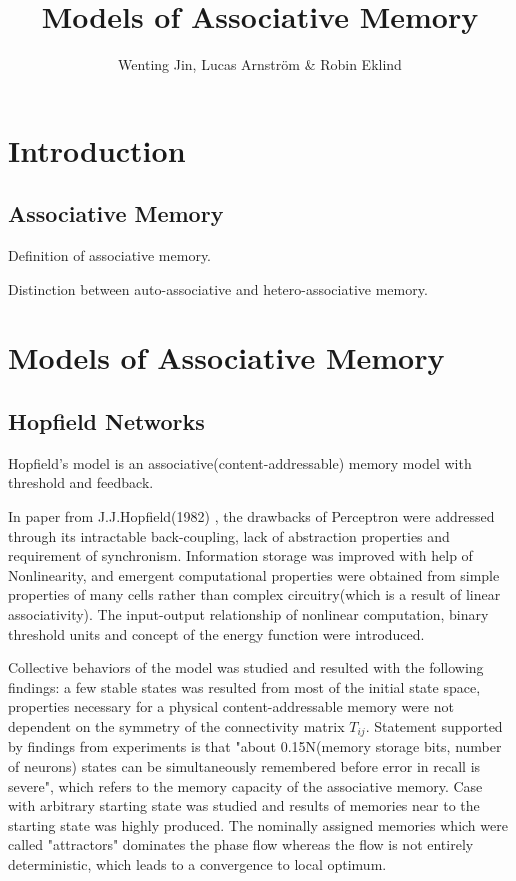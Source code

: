 \documentclass[12pt, a4paper]{article}
\title{Models of Associative Memory}
\author{Wenting Jin, Lucas Arnström \& Robin Eklind}
\begin{document}
\maketitle

\tableofcontents

\clearpage



\section{Introduction}

\subsection{Associative Memory}

Definition of associative memory.

Distinction between auto-associative and hetero-associative memory.


\section{Models of Associative Memory}

\subsection{Hopfield Networks}

Hopfield's model is an associative(content-addressable) memory model with threshold and feedback.

In paper from J.J.Hopfield(1982) \cite{computational_abilities}, the drawbacks of Perceptron were addressed through its intractable back-coupling, lack of abstraction properties and requirement of synchronism. Information storage was improved with help of Nonlinearity, and emergent computational properties were obtained from simple properties of many cells rather than complex circuitry(which is a result of linear associativity). The input-output relationship of nonlinear computation, binary threshold units and concept of the energy function were introduced.

Collective behaviors of the model was studied and resulted with the following findings: a few stable states was resulted from most of the initial state space, properties necessary for a physical content-addressable memory were not dependent on the symmetry of the connectivity matrix $T_{ij}$. Statement supported by findings from experiments is that "about 0.15N(memory storage bits, number of neurons) states can be simultaneously remembered before error in recall is severe", which refers to the memory capacity of the associative memory. Case with arbitrary starting state was studied and results of memories near to the starting state was highly produced. The nominally assigned memories which were called "attractors" dominates the phase flow whereas the flow is not entirely deterministic, which leads to a convergence to local optimum.
\end{document}
